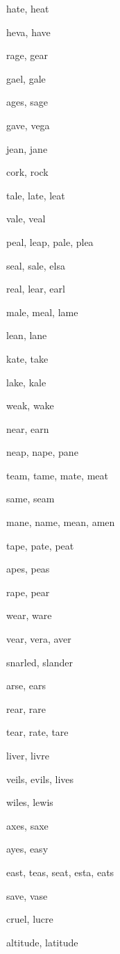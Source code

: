     \item hate, heat
    \item heva, have
    \item rage, gear
    \item gael, gale
    \item ages, sage
    \item gave, vega
    \item jean, jane
    \item cork, rock
    \item tale, late, leat
    \item vale, veal
    \item peal, leap, pale, plea
    \item seal, sale, elsa
    \item real, lear, earl
    \item male, meal, lame
    \item lean, lane
    \item kate, take
    \item lake, kale
    \item weak, wake
    \item near, earn
    \item neap, nape, pane
    \item team, tame, mate, meat
    \item same, seam
    \item mane, name, mean, amen
    \item tape, pate, peat
    \item apes, peas
    \item rape, pear
    \item wear, ware
    \item vear, vera, aver
    \item snarled, slander
    \item arse, ears
    \item rear, rare
    \item tear, rate, tare
    \item liver, livre
    \item veils, evils, lives
    \item wiles, lewis
    \item axes, saxe
    \item ayes, easy
    \item east, teas, seat, esta, eats
    \item save, vase
    \item cruel, lucre
    \item altitude, latitude
